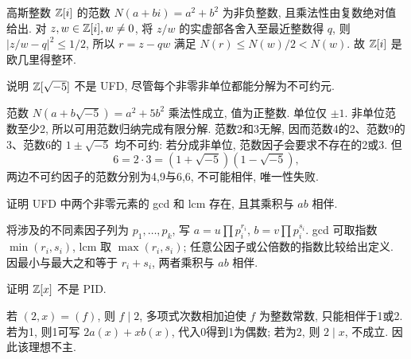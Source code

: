 高斯整数 $\mathbb Z[i]$ 的范数 $N(a+bi)=a^2+b^2$ 为非负整数, 且乘法性由复数绝对值给出. 对 $z,w\in\mathbb Z[i],w\ne0$, 将 $z/w$ 的实虚部各舍入至最近整数得 $q$, 则 $|z/w-q|^2\le1/2$, 所以 $r=z-qw$ 满足 $N(r)\le N(w)/2<N(w)$. 故 $\mathbb Z[i]$ 是欧几里得整环.
\begin{example}说明 $\mathbb Z[\sqrt{-5}]$ 不是 UFD, 尽管每个非零非单位都能分解为不可约元.\end{example}
\begin{solution}
范数 $N(a+b\sqrt{-5})=a^2+5b^2$ 乘法性成立, 值为正整数. 单位仅 $\pm1$. 非单位范数至少2, 所以可用范数归纳完成有限分解. 范数2和3无解, 因而范数4的2、范数9的3、范数6的 $1\pm\sqrt{-5}$ 均不可约: 若分成非单位, 范数因子会要求不存在的2或3. 但
\[
6=2\cdot3=(1+\sqrt{-5})(1-\sqrt{-5}),
\]
两边不可约因子的范数分别为4,9与6,6, 不可能相伴, 唯一性失败.
\end{solution}
\begin{exercise}证明 UFD 中两个非零元素的 gcd 和 lcm 存在, 且其乘积与 $ab$ 相伴.\end{exercise}
\begin{solution}
将涉及的不同素因子列为 $p_1,\ldots,p_k$, 写 $a=u\prod p_i^{r_i}$, $b=v\prod p_i^{s_i}$. gcd 可取指数 $\min(r_i,s_i)$, lcm 取 $\max(r_i,s_i)$; 任意公因子或公倍数的指数比较给出定义. 因最小与最大之和等于 $r_i+s_i$, 两者乘积与 $ab$ 相伴.
\end{solution}
\begin{exercise}证明 $\mathbb Z[x]$ 不是 PID.\end{exercise}
\begin{solution}
若 $(2,x)=(f)$, 则 $f\mid2$, 多项式次数相加迫使 $f$ 为整数常数, 只能相伴于1或2. 若为1, 则1可写 $2a(x)+xb(x)$, 代入0得到1为偶数; 若为2, 则 $2\mid x$, 不成立. 因此该理想不主.
\end{solution}
